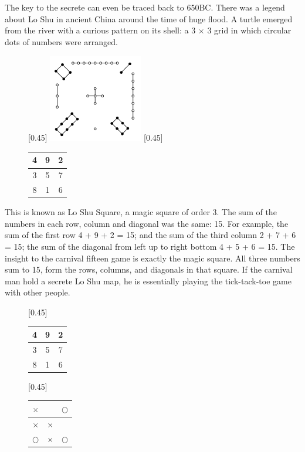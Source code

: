 \documentclass[UTF8]{article}
\begin{document}
The key to the secrete can even be traced back to 650BC. There was a legend about Lo Shu in ancient China around the time of huge flood. A turtle emerged from the river with a curious pattern on its shell: a 3 $\times$ 3 grid in which circular dots of numbers were arranged.

\begin{figure}[htbp]
 \centering
 [0.45\linewidth]{ \includegraphics[scale=0.6]{img/luo-shu.png}}
 [0.45\linewidth]{
   \begin{tabular}{|c|c|c|}
   \hline
   4 & 9 & 2 \\
   \hline
   3 & 5 & 7 \\
   \hline
   8 & 1 & 6 \\
   \hline
   \end{tabular}
   \vspace{8mm}
 }
 \captionsetup{labelformat=empty}
 \caption{}
 \label{fig:luo-shu}
\end{figure}

This is known as Lo Shu Square, a magic square of order 3. The sum of the numbers in each row, column and diagonal was the same: 15. For example, the sum of the first row 4 + 9 + 2 = 15; and the sum of the third column 2 + 7 + 6 = 15; the sum of the diagonal from left up to right bottom 4 + 5 + 6 = 15. The insight to the carnival fifteen game is exactly the magic square. All three numbers sum to 15, form the rows, columns, and diagonals in that square. If the carnival man hold a secrete Lo Shu map, he is essentially playing the tick-tack-toe game with other people.

\begin{figure}[htbp]
 \centering
 [0.45\linewidth]{
   \begin{tabular}{|c|c|c|}
   \hline
   4 & 9 & 2 \\
   \hline
   3 & 5 & 7 \\
   \hline
   8 & 1 & 6 \\
   \hline
   \end{tabular}
   \vspace{3mm}
 }
 [0.45\linewidth]{
   \begin{tabular}{c|c|c}
   $\times$ &  & $\bigcirc$ \\
   \hline
   $\times$ & $\times$ &  \\
   \hline
   $\bigcirc$ & $\times$ & $\bigcirc$ \\
   \end{tabular}
   \vspace{3mm}
 }
 \captionsetup{labelformat=empty}
 \caption{}
 \label{fig:bingo-magic-square}
\end{figure}
\end{document}
